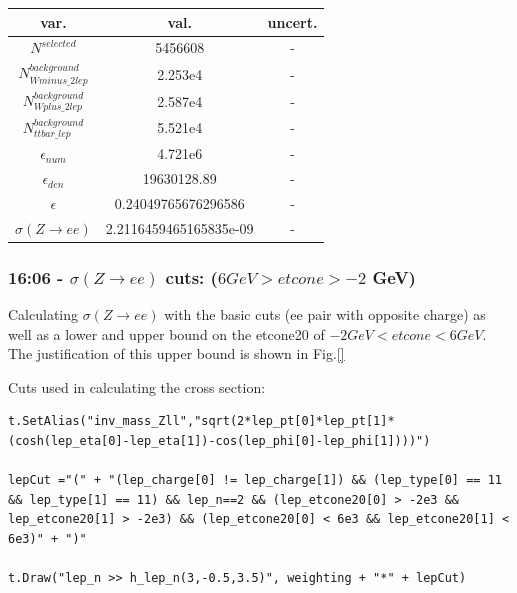 \begin{tabular}{ | c | c | c |}
  \hline			
  var. & val. & uncert. \\
  \hline 
  
  $N^{selected}$ & 5456608 & - \\
  
  $N^{background}_{Wminus\_2lep}$ & 2.253e4 & - \\
  
  $N^{background}_{Wplus\_2lep}$ & 2.587e4 & - \\
  
  $N^{background}_{ttbar\_lep}$ & 5.521e4 & - \\
  
  $\epsilon_{num}$ & 4.721e6 & - \\
  
  $\epsilon_{den}$ & 19630128.89 & - \\
  \hline  
  $\epsilon$ & 0.24049765676296586 & - \\
  $\sigma(Z \rightarrow ee)$ & 2.2116459465165835e-09 & - \\
  \hline  
\end{tabular}

\subsubsection*{16:06 - $\sigma(Z \rightarrow ee)$ cuts: ($6GeV > etcone > -2$ GeV)}
Calculating $\sigma(Z \rightarrow ee)$ with the basic cuts (ee pair with opposite charge) as well as a lower and upper bound on the etcone20 of $-2 GeV < etcone < 6 GeV$.   
\\
The justification of this upper bound is shown in Fig.\ref{}

Cuts used in calculating the cross section:
\begin{lstlisting}
t.SetAlias("inv_mass_Zll","sqrt(2*lep_pt[0]*lep_pt[1]*(cosh(lep_eta[0]-lep_eta[1])-cos(lep_phi[0]-lep_phi[1])))")
    
lepCut ="(" + "(lep_charge[0] != lep_charge[1]) && (lep_type[0] == 11 && lep_type[1] == 11) && lep_n==2 && (lep_etcone20[0] > -2e3 && lep_etcone20[1] > -2e3) && (lep_etcone20[0] < 6e3 && lep_etcone20[1] < 6e3)" + ")"    

t.Draw("lep_n >> h_lep_n(3,-0.5,3.5)", weighting + "*" + lepCut)
\end{lstlisting}

